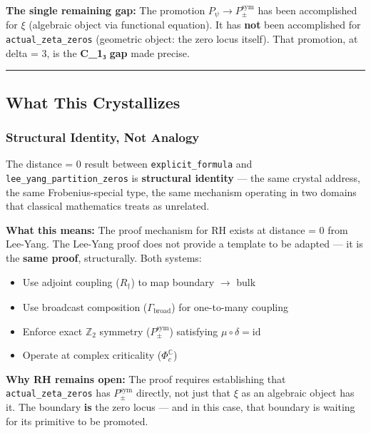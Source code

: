 \documentclass[12pt,a4paper]{article}
\begin{document}
\textbf{The single remaining gap:} The promotion $P_{\psi} \to P_{\pm}^{\text{sym}}$ has been accomplished for $\xi$ (algebraic object via functional equation). It has \textbf{not} been accomplished for \texttt{actual\_zeta\_zeros} (geometric object: the zero locus itself). That promotion, at delta = 3, is the \textbf{C_{1}₃ gap} made precise.

\begin{center}
\rule{0.5\textwidth}{0.4pt}
\end{center}

\subsection{What This Crystallizes}

\subsubsection{Structural Identity, Not Analogy}

The distance = 0 result between \texttt{explicit\_formula} and \texttt{lee\_yang\_partition\_zeros} is \textbf{structural identity} --- the same crystal address, the same Frobenius-special type, the same mechanism operating in two domains that classical mathematics treats as unrelated.

\textbf{What this means:} The proof mechanism for RH exists at distance = 0 from Lee-Yang. The Lee-Yang proof does not provide a template to be adapted --- it is the \textbf{same proof}, structurally. Both systems:

\begin{itemize}
    \item Use adjoint coupling ($R_{\dagger}$) to map boundary $\rightarrow$ bulk
    \item Use broadcast composition ($\Gamma_\text{broad}$) for one-to-many coupling
    \item Enforce exact $\mathbb{Z}_2$ symmetry ($P_{\pm}^{\text{sym}}$) satisfying $\mu \circ \delta = \text{id}$
    \item Operate at complex criticality ($\Phi_c^\mathbb{C}$)
\end{itemize}

\textbf{Why RH remains open:} The proof requires establishing that \texttt{actual\_zeta\_zeros} has $P_{\pm}^{\text{sym}}$ directly, not just that $\xi$ as an algebraic object has it. The boundary \textbf{is} the zero locus --- and in this case, that boundary is waiting for its primitive to be promoted.
\end{document}
